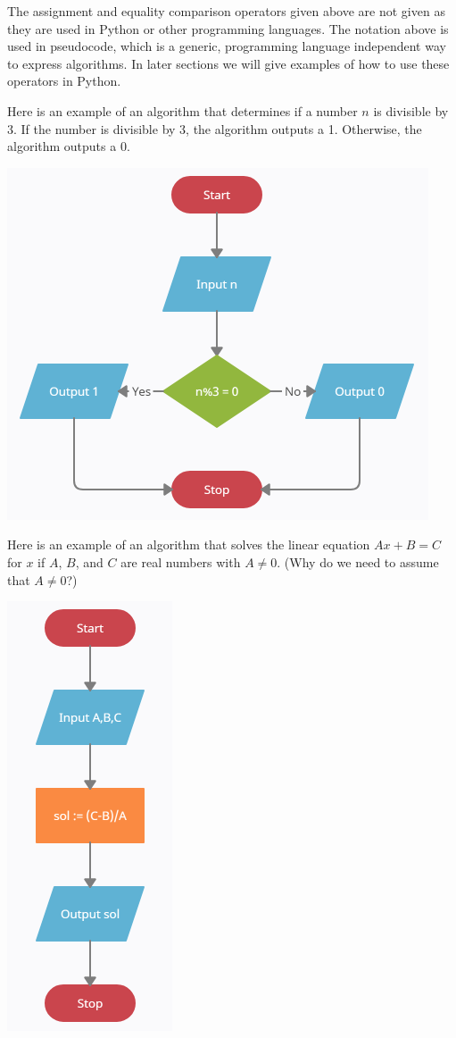 \documentclass{ximera}
\begin{document}
The assignment and equality comparison operators given above are not given as they are used in Python or other programming languages. The notation above is used in pseudocode, which is a generic, programming language independent way to express algorithms. In later sections we will give examples of how to use these operators in Python. 

Here is an example of an algorithm that determines if a number $n$ is divisible by 3. If the number is divisible by 3, the algorithm outputs a 1. Otherwise, the algorithm outputs a 0.

\begin{center}
	\includegraphics{divby3.png}
\end{center}

Here is an example of an algorithm that solves the linear equation $Ax+B=C$ for $x$ if $A$, $B$, and $C$ are real numbers with $A\neq 0$. (Why do we need to assume that $A\neq 0$?)

\begin{center}
	\includegraphics{solvelinear.png}
\end{center}
\end{document}
